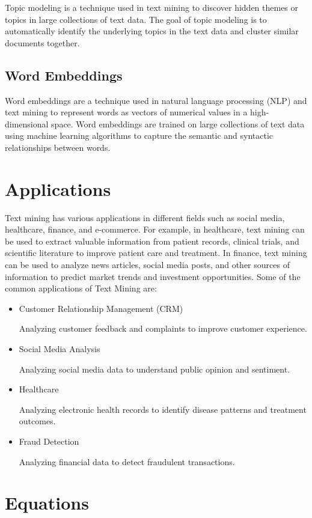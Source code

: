 \documentclass{article}
\begin{document}
Topic modeling is a technique used in text mining to discover hidden themes or topics in large collections of text data. The goal of topic modeling is to automatically identify the underlying topics in the text data and cluster similar documents together.

\subsection{Word Embeddings}

Word embeddings are a technique used in natural language processing (NLP) and text mining to represent words as vectors of numerical values in a high-dimensional space. Word embeddings are trained on large collections of text data using machine learning algorithms to capture the semantic and syntactic relationships between words.

\section{Applications}

Text mining has various applications in different fields such as social media, healthcare, finance, and e-commerce. For example, in healthcare, text mining can be used to extract valuable information from patient records, clinical trials, and scientific literature to improve patient care and treatment. In finance, text mining can be used to analyze news articles, social media posts, and other sources of information to predict market trends and investment opportunities. Some of the common applications of Text Mining are:
\begin{itemize}
\item{Customer Relationship Management (CRM)}

Analyzing customer feedback and complaints to improve customer experience.
\item{Social Media Analysis}

Analyzing social media data to understand public opinion and sentiment.
\item{Healthcare}

Analyzing electronic health records to identify disease patterns and treatment outcomes.
\item{Fraud Detection}

Analyzing financial data to detect fraudulent transactions.
\end{itemize}

\section{Equations}
\end{document}
